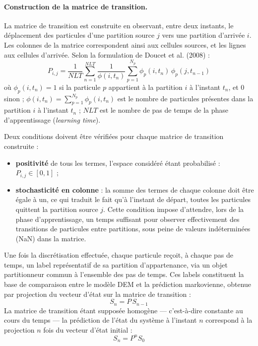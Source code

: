 \documentclass{MemoireMaster}
\begin{document}
\paragraph{Construction de la matrice de transition.} La matrice de transition est construite en observant, entre deux instants, le déplacement des particules d'une partition source $j$ vers une partition d'arrivée $i$. Les colonnes de la matrice correspondent ainsi aux cellules sources, et les lignes aux cellules d'arrivée. Selon la formulation de Doucet et al. (2008) \cite{doucet2008} :
\begin{equation}
P_{i,j} = \frac{1}{NLT} \sum_{n=1}^{NLT} \frac{1}{\phi(i,t_n)} \sum_{p=1}^{N_p} \phi_p(i,t_n)\,\phi_p(j,t_{n-1})
\end{equation}
où $\phi_p(i,t_n) = 1$ si la particule $p$ appartient à la partition $i$ à l'instant $t_n$, et $0$ sinon ; $\phi(i,t_n) = \sum_{p=1}^{N_p} \phi_p(i,t_n)$ est le nombre de particules présentes dans la partition $i$ à l'instant $t_n$ ; $NLT$ est le nombre de pas de temps de la phase d'apprentissage (\emph{learning time}).

Deux conditions doivent être vérifiées pour chaque matrice de transition construite :
\begin{itemize}
\item \textbf{positivité} de tous les termes, l'espace considéré étant probabilisé : $P_{i,j} \in [0,1]$ ;
\item \textbf{stochasticité en colonne} : la somme des termes de chaque colonne doit être égale à un, ce qui traduit le fait qu'à l'instant de départ, toutes les particules quittent la partition source $j$. Cette condition impose d'attendre, lors de la phase d'apprentissage, un temps suffisant pour observer effectivement des transitions de particules entre partitions, sous peine de valeurs indéterminées (NaN) dans la matrice.
\end{itemize}

Une fois la discrétisation effectuée, chaque particule reçoit, à chaque pas de temps, un label représentatif de sa partition d'appartenance, via un objet partitionneur commun à l'ensemble des pas de temps. Ces labels constituent la base de comparaison entre le modèle DEM et la prédiction markovienne, obtenue par projection du vecteur d'état sur la matrice de transition :
\begin{equation}
S_n = P\,S_{n-1}
\end{equation}
La matrice de transition étant supposée homogène --- c'est-à-dire constante au cours du temps --- la prédiction de l'état du système à l'instant $n$ correspond à la projection $n$ fois du vecteur d'état initial :
\begin{equation}
S_n = P^n S_0
\end{equation}
\end{document}
